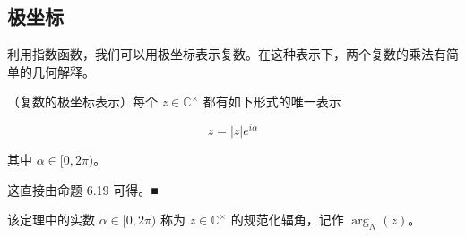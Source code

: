 \subsection*{极坐标}

利用指数函数，我们可以用极坐标表示复数。在这种表示下，两个复数的乘法有简单的几何解释。

\begin{theorem}

（复数的极坐标表示）每个 $ z \in \mathbb{C}^\times $ 都有如下形式的唯一表示

\[
z=|z|e^{i\alpha}
\]

其中 $ \alpha \in [0, 2\pi) $。

\proofhead
这直接由命题 6.19 可得。■
\end{theorem}

该定理中的实数 $ \alpha \in [0, 2\pi) $ 称为 $ z \in \mathbb{C}^\times $ 的规范化辐角，记作 $ \arg_N(z) $。

